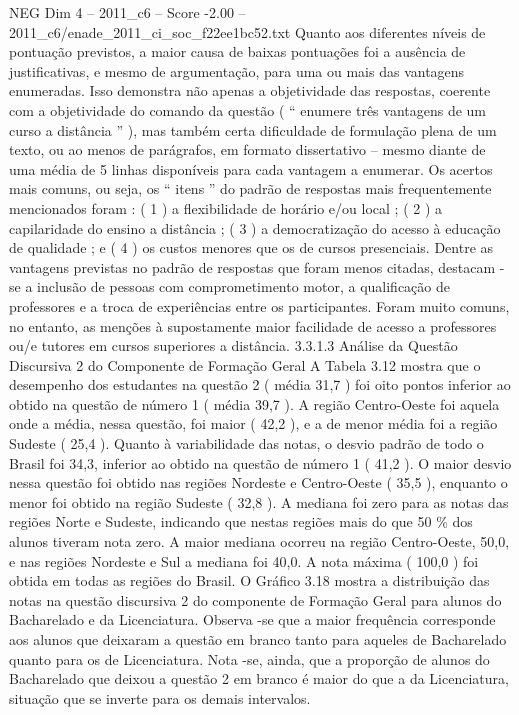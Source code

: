 \begin{textsample}{NEG Dim 4 – 2011\_c6 – Score -2.00 – 2011\_c6/enade\_2011\_ci\_soc\_f22ee1bc52.txt}
Quanto aos diferentes níveis de pontuação previstos, a maior causa de baixas pontuações foi a ausência de justificativas, e mesmo de argumentação, para uma ou mais das vantagens enumeradas.
Isso demonstra não apenas a objetividade das respostas, coerente com a objetividade do comando da questão ( “ enumere três vantagens de um curso a distância ” ), mas também certa dificuldade de formulação plena de um texto, ou ao menos de parágrafos, em formato dissertativo – mesmo diante de uma média de 5 linhas disponíveis para cada vantagem a enumerar.
Os acertos mais comuns, ou seja, os “ itens ” do padrão de respostas mais frequentemente mencionados foram : ( 1 ) a flexibilidade de horário e/ou local ; ( 2 ) a capilaridade do ensino a distância ; ( 3 ) a democratização do acesso à educação de qualidade ; e ( 4 ) os custos menores que os de cursos presenciais.
Dentre as vantagens previstas no padrão de respostas que foram menos citadas, destacam -se a inclusão de pessoas com comprometimento motor, a qualificação de professores e a troca de experiências entre os participantes.
Foram muito comuns, no entanto, as menções à supostamente maior facilidade de acesso a professores ou/e tutores em cursos superiores a distância. 3.3.1.3 Análise da Questão Discursiva 2 do Componente de Formação Geral A Tabela 3.12 mostra que o desempenho dos estudantes na questão 2 ( média 31,7 ) foi oito pontos inferior ao obtido na questão de número 1 ( média 39,7 ).
A região Centro-Oeste foi aquela onde a média, nessa questão, foi maior ( 42,2 ), e a de menor média foi a região Sudeste ( 25,4 ).
Quanto à variabilidade das notas, o desvio padrão de todo o Brasil foi 34,3, inferior ao obtido na questão de número 1 ( 41,2 ).
O maior desvio nessa questão foi obtido nas regiões Nordeste e Centro-Oeste ( 35,5 ), enquanto o menor foi obtido na região Sudeste ( 32,8 ).
A mediana foi zero para as notas das regiões Norte e Sudeste, indicando que nestas regiões mais do que 50 \% dos alunos tiveram nota zero.
A maior mediana ocorreu na região Centro-Oeste, 50,0, e nas regiões Nordeste e Sul a mediana foi 40,0.
A nota máxima ( 100,0 ) foi obtida em todas as regiões do Brasil.
O Gráfico 3.18 mostra a distribuição das notas na questão discursiva 2 do componente de Formação Geral para alunos do Bacharelado e da Licenciatura.
Observa -se que a maior frequência corresponde aos alunos que deixaram a questão em branco tanto para aqueles de Bacharelado quanto para os de Licenciatura.
Nota -se, ainda, que a proporção de alunos do Bacharelado que deixou a questão 2 em branco é maior do que a da Licenciatura, situação que se inverte para os demais intervalos.

\end{textsample}
